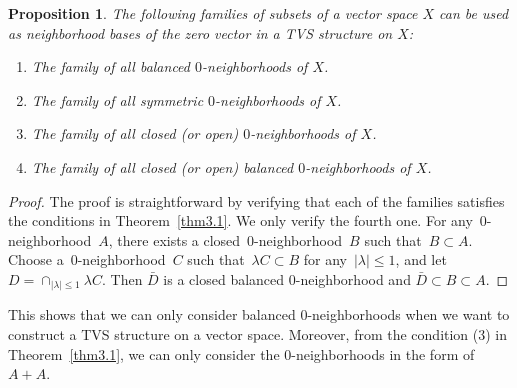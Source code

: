 \documentclass[12pt,a4paper,draft]{article}  %
\newtheorem{proposition}{Proposition}[section]
\theoremstyle{definition}
\numberwithin{equation}{section}
\begin{document}
\begin{proposition}
    The following families of subsets of a vector space $X$ can be used as neighborhood bases of the zero vector in a TVS structure on $X$:
    \begin{enumerate}
        \item The family of all balanced $0$-neighborhoods of $X$.
        \item The family of all symmetric $0$-neighborhoods of $X$.
        \item The family of all closed (or open) $0$-neighborhoods of $X$.
        \item The family of all closed (or open) balanced $0$-neighborhoods of $X$.
    \end{enumerate}
\end{proposition}
\begin{proof}
    The proof is straightforward by verifying that each of the families satisfies the conditions in Theorem~\eqref{thm3.1}.
    We only verify the fourth one.
    For any~$0$-neighborhood~$A$, there exists a closed~$0$-neighborhood~$B$ such that~$B \subset A$.
    Choose a~$0$-neighborhood~$C$ such that~$\lambda C \subset B$ for any~$|\lambda| \leq 1$,
    and let $D=\cap_{|\lambda| \leq 1} \lambda C$.
    Then $\bar{D}$ is a closed balanced $0$-neighborhood and $\bar{D} \subset B \subset A$.
\end{proof}
This shows that we can only consider balanced $0$-neighborhoods when we want to construct a TVS structure on a vector space.
Moreover, from the condition (3) in Theorem~\eqref{thm3.1},
we can only consider the $0$-neighborhoods in the form of $A+A$.
\end{document}

